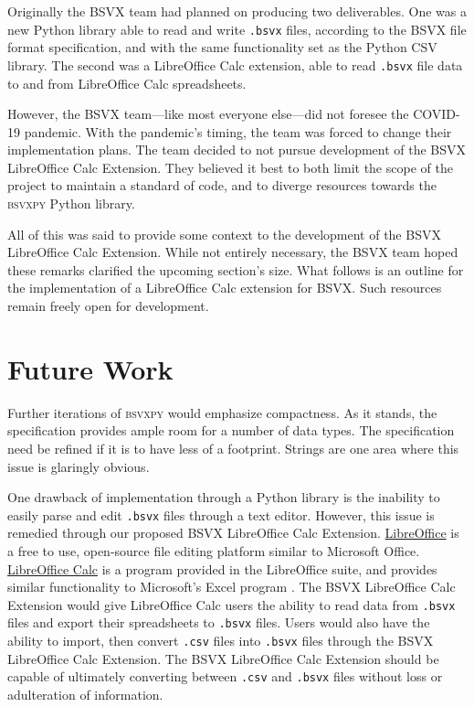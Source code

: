 \documentclass[10pt]{article}
\begin{document}
\indent{}
Originally the BSVX team had planned on producing two deliverables.
One was a new Python library able to read and write \texttt{.bsvx} files, according to the BSVX file format specification, and with the same functionality set as the Python CSV library.
The second was a LibreOffice Calc extension, able to read \texttt{.bsvx} file data to and from LibreOffice Calc spreadsheets.

\indent{}
However, the BSVX team---like most everyone else---did not foresee the COVID-19 pandemic. 
With the pandemic's timing, the team was forced to change their implementation plans.
The team decided to not pursue development of the BSVX LibreOffice Calc Extension.
They believed it best to both limit the scope of the project to maintain a standard of code, and to diverge resources towards the \textsc{bsvxpy} Python library.

\indent{}
All of this was said to provide some context to the development of the BSVX LibreOffice Calc Extension.
While not entirely necessary, the BSVX team hoped these remarks clarified the upcoming section's size.
What follows is an outline for the implementation of a LibreOffice Calc extension for BSVX.
Such resources remain freely open for development.

\section*{Future Work}

Further iterations of \textsc{bsvxpy} would emphasize compactness.
As it stands, the specification provides ample room for a number of data types.
The specification need be refined if it is to have less of a footprint.
Strings are one area where this issue is glaringly obvious.


\indent{}
One drawback of implementation through a Python library is the inability to easily parse and edit \texttt{.bsvx} files through a text editor.
However, this issue is remedied through our proposed BSVX LibreOffice Calc Extension.
\href{https://www.libreoffice.org/discover/libreoffice/}{LibreOffice} is a free to use, open-source file editing platform similar to Microsoft Office.
\href{https://www.libreoffice.org/discover/calc/}{LibreOffice Calc} is a program provided in the LibreOffice suite, and provides similar functionality to Microsoft’s Excel program \cite{Guthrie2012}.
The BSVX LibreOffice Calc Extension would give LibreOffice Calc users the ability to read data from \texttt{.bsvx} files and export their spreadsheets to \texttt{.bsvx} files.
Users would also have the ability to import, then convert \texttt{.csv} files into \texttt{.bsvx} files through the BSVX LibreOffice Calc Extension. The BSVX LibreOffice Calc Extension should be capable of ultimately converting between \texttt{.csv} and \texttt{.bsvx} files without loss or adulteration of information.
\end{document}
